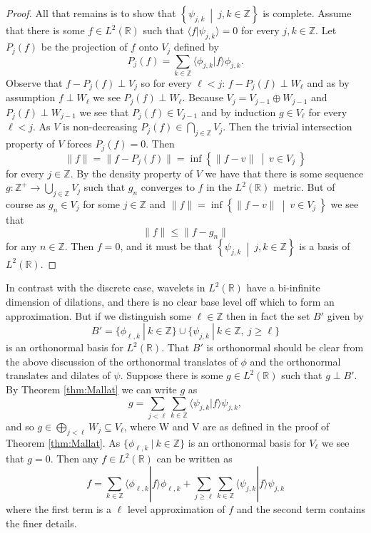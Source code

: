 \documentclass{report}
\newcommand{\Z}{\mathbb{Z}}
\newcommand{\R}{\mathbb{R}}
\begin{document}
\begin{proof}
All that remains is to show that $\left \{ \psi_{j,k} \ \middle | \ j,k \in \Z \right \}$ is complete. Assume that there is some $f \in L^2 (\R)$ such that $\langle f | \psi_{j,k} \rangle=0 $ for every $j,k \in \Z$. 
Let $P_j(f)$ be the projection of $f$ onto $V_j$ defined by
 $$P_j(f) =\sum_{k \in \Z} \langle \phi_{j,k} | f \rangle \phi_{j,k}.$$
Observe that $f-P_j(f)\perp V_j$ so for every $\ell < j$: $f-P_j(f) \perp W_\ell$ and as by assumption $f \perp W_\ell$ we see $P_j(f) \perp W_\ell$.
Because $V_j=V_{j-1} \oplus W_{j-1}$ and $P_j(f) \perp W_{j-1}$ we see that $P_j(f) \in V_{j-1}$ and by induction $g \in V_\ell$ for every $\ell < j$.
As $V$ is non-decreasing $P_j(f) \in \bigcap_{j \in \Z} V_j$.
Then the trivial intersection property of $V$ forces $P_j(f)=0$.
Then $$\|f\|=\|f-P_j(f)\|=\inf \left \{ \|f-v\| \ \middle | \  v\in V_j\  \right \}$$ for every $j \in \Z$.
By the density property of $V$ we have that there is some sequence $g: \Z^+ \to \bigcup_{j\in\Z} V_j$ such that $g_n$ converges to $f$ in the $L^2 (\R)$ metric. But of course as $g_n \in V_j$ for some $j \in \Z$ and 
$\|f\|=\inf \left \{ \|f-v\| \ \middle | \  v\in V_j\  \right \}$
we see that $$\|f\| \leq \|f-g_n\|$$
for any $n\in \Z$. Then $f =0$, and it must be that $\left \{ \psi_{j,k} \ \middle | \ j,k \in \Z \right \}$ is a basis of $L^2 (\R)$.
\end{proof}

In contrast with the discrete case, wavelets in $L^2(\R)$ have a bi-infinite dimension of dilations, and there is no clear base level off which to form an approximation. But if we distinguish some $\ell \in \Z$ then in fact the set $B'$ given by
$$
B'=\{\phi_{\ell,k} \ | \ k\in \Z \} \cup \{\psi_{j,k} \ | \ k\in \Z , \ j \geq \ell \}
$$
is an orthonormal basis for $L^2 (\R)$. That $B'$ is orthonormal should be clear from the above discussion of the orthonormal translates of $\phi$ and the orthonormal translates and dilates of $\psi$. Suppose there is some $g \in L^2 (\R)$ such that $g \perp B'$. By Theorem \ref{thm:Mallat} we can write  $g$ as 
$$
g=\sum_{j < \ell} \sum_{k \in \Z} \langle  \psi_{j,k} | f \rangle \psi_{j,k},
$$
and so $g \in \bigoplus_{j<\ell} W_j \subseteq V_\ell$, where W and V are as defined in the proof of Theorem \ref{thm:Mallat}. As $\{\phi_{\ell,k} \ | \ k\in \Z \}$ is an orthonormal basis for $V_\ell$ we see that $g=0$. Then any $f \in L^2 (\R)$ can be written as
$$
f=\sum_{ k \in \Z} \langle  \phi_{\ell,k} | f \rangle \phi_{\ell,k} + \sum_{j \geq \ell}\sum_{k \in \Z} \langle  \psi_{j,k} | f \rangle \psi_{j,k}
$$
where the first term is a $\ell$ level approximation of $f$ and the second term contains the finer details.
\end{document}
